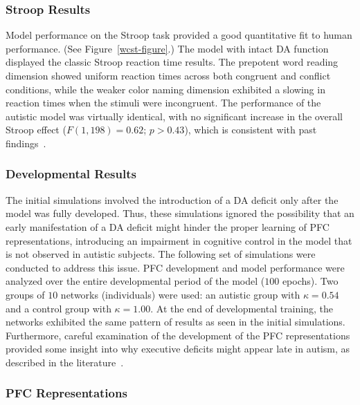 \subsubsection{Stroop Results} 

Model performance on the Stroop task provided a good quantitative fit to human performance.  (See Figure~\ref{wcst-figure}.) The model with intact DA function displayed the classic Stroop reaction time results.  The prepotent word reading dimension showed uniform reaction times across both congruent and conflict conditions, while the weaker color naming dimension exhibited a slowing in reaction times when the stimuli were incongruent.  The performance of the autistic model was virtually identical, with no significant increase in the overall Stroop effect ($F(1,198) = 0.62$; $p > 0.43$), which is consistent with past findings~\cite{Ozonoff:1999:AutismStroopWCST}.


\subsubsection{Developmental Results}

The initial simulations involved the introduction of a DA deficit only
after the model was fully developed.  Thus, these simulations ignored
the possibility that an early manifestation of a DA deficit might
hinder the proper learning of PFC representations, introducing an
impairment in cognitive control in the model that is not observed in
autistic subjects.  The following set of simulations were conducted to
address this issue.   PFC
development and model performance were analyzed over the entire
developmental period of the model ($100$ epochs).  Two groups of $10$
networks (individuals) were used: an autistic group with $\kappa = 0.54$
and a control group with $\kappa = 1.00$.  At the end of developmental
training, the networks exhibited the same pattern of results as seen
in the initial simulations.  Furthermore, careful examination of the development of the PFC representations provided some insight into why executive deficits might
appear late in autism, as described in the
literature~\cite{GriffithEM:1999:AutismYoungED}.  

\subsubsection{PFC Representations} 

